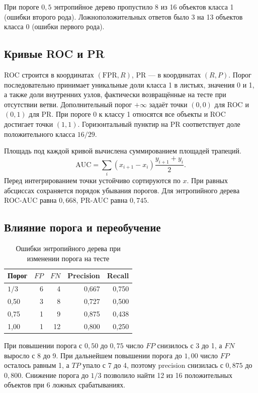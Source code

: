 При пороге \(0{,}5\) энтропийное дерево пропустило 8 из 16 объектов
класса 1 (ошибки второго рода). Ложноположительных ответов было 3
на 13 объектов класса 0 (ошибки первого рода).

\subsection{Кривые ROC и PR}

ROC строится в координатах \((\mathrm{FPR},R)\), PR ---
в координатах \((R,P)\). Порог последовательно принимает уникальные
доли класса 1 в листьях, значения 0 и 1, а также доли внутренних узлов,
фактически возвращённые на тесте при отсутствии ветви. Дополнительный
порог \(+\infty\) задаёт точки \((0,0)\) для ROC и \((0,1)\) для PR.
При пороге 0 к классу 1 относятся все объекты и ROC достигает
точки \((1,1)\). Горизонтальный пунктир на PR соответствует доле
положительного класса \(16/29\).


Площадь под каждой кривой вычислена суммированием площадей трапеций.
\[
\mathrm{AUC}=\sum_i (x_{i+1}-x_i)\frac{y_{i+1}+y_i}{2}.
\]
Перед интегрированием точки устойчиво сортируются по \(x\). При равных
абсциссах сохраняется порядок убывания порогов. Для энтропийного дерева
ROC-AUC равна \(0{,}668\), PR-AUC равна \(0{,}745\).

\clearpage
\subsection{Влияние порога и переобучение}

\begin{table}[!ht]
\centering\small
\caption{Ошибки энтропийного дерева при изменении порога на тесте}
\begin{tabular}{lrrrr}
\toprule
Порог & \(FP\) & \(FN\) & Precision & Recall \\
\midrule
\(1/3\) & 6 &  4 & 0,667 & 0,750 \\
0,50    & 3 &  8 & 0,727 & 0,500 \\
0,75    & 1 &  9 & 0,875 & 0,438 \\
1,00    & 1 & 12 & 0,800 & 0,250 \\
\bottomrule
\end{tabular}
\end{table}

При повышении порога с \(0{,}50\) до \(0{,}75\) число \(FP\) снизилось
с 3 до 1, а \(FN\) выросло с 8 до 9. При дальнейшем повышении порога
до \(1{,}00\) число \(FP\) осталось равным 1, а \(TP\) упало с 7 до 4,
поэтому precision снизилась с \(0{,}875\) до \(0{,}800\).
Снижение порога до \(1/3\) позволило найти 12 из 16 положительных
объектов при 6 ложных срабатываниях.

